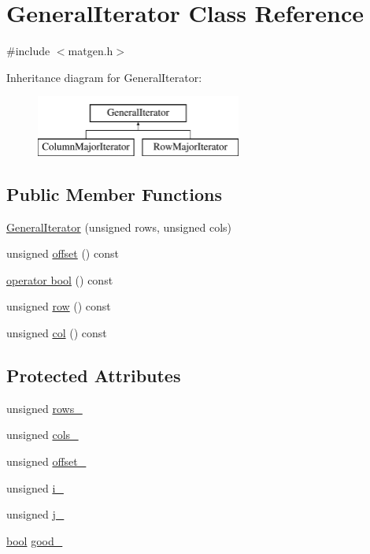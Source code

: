 \hypertarget{classGeneralIterator}{}\section{General\+Iterator Class Reference}
\label{classGeneralIterator}


{\ttfamily \#include $<$matgen.\+h$>$}

Inheritance diagram for General\+Iterator\+:\begin{figure}[H]
\begin{center}
\leavevmode
\includegraphics[height=2.000000cm]{classGeneralIterator}
\end{center}
\end{figure}
\subsection*{Public Member Functions}
\begin{DoxyCompactItemize}
\item 
\hyperlink{classGeneralIterator_a36f0739681a75617dd3c8f2f2b29fdd4}{General\+Iterator} (unsigned rows, unsigned cols)
\item 
unsigned \hyperlink{classGeneralIterator_afa3bb0f974c186c23019fd592ace71c0}{offset} () const 
\item 
\hyperlink{classGeneralIterator_aa897fe92c6d06af59b94f3c9ede584ba}{operator bool} () const 
\item 
unsigned \hyperlink{classGeneralIterator_a0ae3d244bd98156a25b4455b421b874b}{row} () const 
\item 
unsigned \hyperlink{classGeneralIterator_aa4a2805eca53a965588dc7e8c989f1a0}{col} () const 
\end{DoxyCompactItemize}
\subsection*{Protected Attributes}
\begin{DoxyCompactItemize}
\item 
unsigned \hyperlink{classGeneralIterator_a37abbe3be14d2039bc533f67b0295c75}{rows\+\_\+}
\item 
unsigned \hyperlink{classGeneralIterator_a79b45d7433f1cfefda90d1c076990609}{cols\+\_\+}
\item 
unsigned \hyperlink{classGeneralIterator_a77ddc58d7ce3a669e01df2bb8d8b21c1}{offset\+\_\+}
\item 
unsigned \hyperlink{classGeneralIterator_a9e22c8f4827e407016ccb40b2103aacf}{i\+\_\+}
\item 
unsigned \hyperlink{classGeneralIterator_a8ca7c0d4eaa4cee3fcb5aa66b8bbacd8}{j\+\_\+}
\item 
\hyperlink{compiler_8h_abb452686968e48b67397da5f97445f5b}{bool} \hyperlink{classGeneralIterator_aaa7c84a87f8e944b7de35a80066bf73a}{good\+\_\+}
\end{DoxyCompactItemize}


